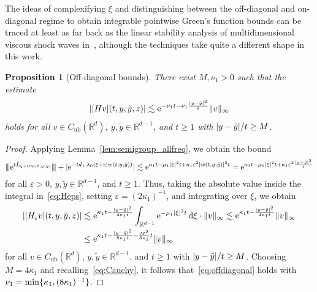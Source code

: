 \documentclass[12pt,oneside,a4paper,reqno]{amsart}
\numberwithin{equation}{section}
\newtheorem{proposition}[theorem]{Proposition}
\theoremstyle{definition}
\theoremstyle{remark}
\newcommand{\bbR}{{\mathbb R}}
\newcommand{\rd}{{\,\rm{d}}}
\newcommand{\eps}{\varepsilon}
\newcommand{\Cub}{{C_{\mathrm{ub}}}}
\newcommand{\re}{{\rm e}}
\newcommand{\ri}{{\rm i}}
\DeclarePairedDelimiter{\abs}{\lvert}{\rvert}
\DeclarePairedDelimiter{\norm}{\lVert}{\rVert}
\DeclarePairedDelimiter{\tnorm}{\lvert\kern-0.25ex\lvert\kern-0.25ex\lvert}{\rvert\kern-0.25ex\rvert\kern-0.25ex\rvert}
\DeclarePairedDelimiter{\cur}{\{}{\}}
\begin{document}
The ideas of complexifying $\xi$ and distinguishing between the off-diagonal and on-diagonal regime to obtain integrable pointwise Green's function bounds can be traced at least as far back as the linear stability analysis of multidimensional viscous shock waves in~\cite{Hoff_pointwise_2002}, although the techniques take quite a different shape in this work. 

\begin{proposition}[Off-diagonal bounds]
    \label{prop:offdiagonal}
    There exist $M,\nu_1 > 0$ such that the estimate
    \begin{equation}
        \label{eq:offdiagonal}
        \abs{[Hv](t,y,\tilde{y},z)} \lesssim \re^{-\nu_1 t - \nu_1 \frac{\abs{y - \tilde{y}}^2}{t}} \norm{v}_{\infty}
    \end{equation}
    holds for all $v \in \Cub(\bbR^{d})$, $y,\tilde{y} \in \bbR^{d-1}$, and $t \geq 1$ with $\abs{y - \tilde{y}} / t \geq M$.
\end{proposition}
\begin{proof}
    Applying Lemma~\ref{lem:semigroup_allfreq}, we obtain the bound
    \begin{align*}
        \tnorm{\re^{t\hat{L}_{\xi + \ri \eps w(t,y,\tilde{y})}}} + \abs{\re^{-td_{\bot}\lambda_0(\xi + \ri \eps w(t,y,\tilde{y}))}} \lesssim \re^{\kappa_1 t - \mu_1 \abs{\xi}^2 t + \kappa_1 \eps^2\abs{w(t,y,\tilde{y})}^2t} 
        = \re^{\kappa_1 t - \mu_1 \abs{\xi}^2 t + \kappa_1 \eps^2\frac{\abs{y - \tilde{y}}^2}{t}}
    \end{align*}
    for all $\eps > 0$, $y,\tilde{y} \in \bbR^{d-1}$, and $t \geq 1$. Thus, taking the absolute value inside the integral in~\eqref{eq:Heps}, setting $\eps = (2\kappa_1)^{-1}$, and integrating over $\xi$, we obtain
    \begin{align*}
        \abs{[H_{\eps}v](t,y,\tilde{y},z)} &\lesssim \re^{\kappa_1 t -\frac{\abs{y - \tilde{y}}^2}{4\kappa_1 t}}  \int_{\bbR^{d-1}}\re^{-\mu_1 \abs{\xi}^2 t} \rd \xi \cdot \|v\|_\infty
        \lesssim \re^{\kappa_1 t -\frac{\abs{y - \tilde{y}}^2}{4\kappa_1 t}} \|v\|_\infty \\
        &\leq \re^{\kappa_1 t -\frac{\abs{y - \tilde{y}}^2}{8 \kappa_1 t} - \frac{M^2}{8 \kappa_1} t} \|v\|_\infty
    \end{align*}
    for all $v \in \Cub(\bbR^{d})$, $y,\tilde{y} \in \bbR^{d-1}$, and $t \geq 1$ with $\abs{y - \tilde{y}} / t \geq M$. Choosing $M = 4 \kappa_1$ and recalling~\eqref{eq:Cauchy}, it follows that~\eqref{eq:offdiagonal} holds with $\nu_1 = \min\cur{\kappa_1,(8\kappa_1)^{-1}}$.
\end{proof}
\end{document}
